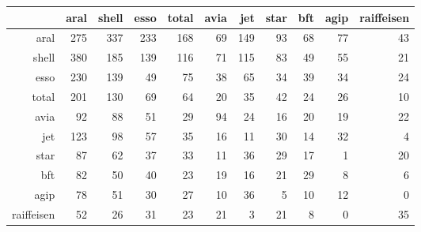 \begin{table}[ht]
\centering
\begin{tabular}{rrrrrrrrrrr}
  \hline
 & aral & shell & esso & total & avia & jet & star & bft & agip & raiffeisen \\ 
  \hline
aral & 275 & 337 & 233 & 168 &  69 & 149 &  93 &  68 &  77 &  43 \\ 
  shell & 380 & 185 & 139 & 116 &  71 & 115 &  83 &  49 &  55 &  21 \\ 
  esso & 230 & 139 &  49 &  75 &  38 &  65 &  34 &  39 &  34 &  24 \\ 
  total & 201 & 130 &  69 &  64 &  20 &  35 &  42 &  24 &  26 &  10 \\ 
  avia &  92 &  88 &  51 &  29 &  94 &  24 &  16 &  20 &  19 &  22 \\ 
  jet & 123 &  98 &  57 &  35 &  16 &  11 &  30 &  14 &  32 &   4 \\ 
  star &  87 &  62 &  37 &  33 &  11 &  36 &  29 &  17 &   1 &  20 \\ 
  bft &  82 &  50 &  40 &  23 &  19 &  16 &  21 &  29 &   8 &   6 \\ 
  agip &  78 &  51 &  30 &  27 &  10 &  36 &   5 &  10 &  12 &   0 \\ 
  raiffeisen &  52 &  26 &  31 &  23 &  21 &   3 &  21 &   8 &   0 &  35 \\ 
   \hline
\end{tabular}
\end{table}
